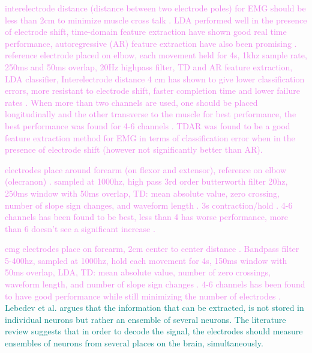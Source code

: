 \textcolor{violet}{interelectrode distance (distance between two electrode poles) for EMG should be less than 2cm to minimize muscle cross talk \cite{youngImprovingMyoelectricPattern2012}. LDA performed well in the presence of electrode shift, time-domain feature extraction have shown good real time performance, autoregressive (AR) feature extraction have also been promising \cite{youngImprovingMyoelectricPattern2012}. reference electrode placed on elbow, each movement held for 4s, 1khz sample rate, 250ms and 50ms overlap, 20Hz highpass filter, TD and AR feature extraction, LDA classifier, Interelectrode distance 4 cm has shown to give lower classification errors, more resistant to electrode shift, faster completion time and lower failure rates \cite{youngImprovingMyoelectricPattern2012}. When more than two channels are used, one should be placed longitudinally and the other transverse to the muscle for best performance, the best performance was found for 4-6 channels \cite{youngImprovingMyoelectricPattern2012}. TDAR was found to be a good feature extraction method for EMG in terms of classification error when in the presence of electrode shift (however not significantly better than AR)\cite{youngImprovingMyoelectricPattern2012}.           }

\textcolor{violet}{electrodes place around forearm (on flexor and extensor), reference on elbow (olecranon) \cite{youngClassificationSimultaneousMovements2013}. sampled at 1000hz, high pass 3rd order butterworth filter 20hz, 250ms window with 50ms overlap, TD: mean absolute value, zero crossing, number of slope sign changes, and waveform length \cite{youngClassificationSimultaneousMovements2013}. 3s contraction/hold \cite{youngClassificationSimultaneousMovements2013}. 4-6 channels has been found to be best, less than 4 has worse performance, more than 6 doesn't see a significant increase \cite{youngClassificationSimultaneousMovements2013}.        }

\textcolor{violet}{emg electrodes place on forearm, 2cm center to center distance \cite{liQuantifyingPatternRecognition2010}. Bandpass filter 5-400hz, sampled at 1000hz, hold each movement for 4s, 150ms window with 50ms overlap, LDA, TD: mean absolute value, number of zero crossings, waveform length, and
number of slope sign changes \cite{liQuantifyingPatternRecognition2010}. 4-6 channels has been found to have good performance while still minimizing the number of electrodes \cite{liQuantifyingPatternRecognition2010}.           }
\textcolor{teal}{
	Lebedev et al. argues that the information that can be extracted, is not stored in individual neurons but rather an ensemble of several neurons. The literature review suggests that in order to decode the signal, the electrodes should measure ensembles of neurons from several places on the brain, simultaneously\cite{lebedevBrainMachineInterfacesBasic2017a}.
}


